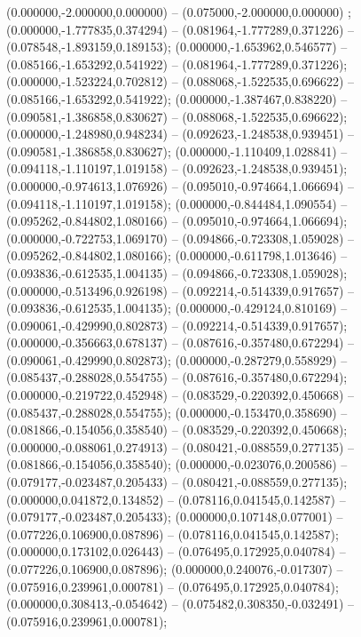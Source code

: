  (0.000000,-2.000000,0.000000) -- (0.075000,-2.000000,0.000000) ;
 (0.000000,-1.777835,0.374294) -- (0.081964,-1.777289,0.371226) -- (0.078548,-1.893159,0.189153);
 (0.000000,-1.653962,0.546577) -- (0.085166,-1.653292,0.541922) -- (0.081964,-1.777289,0.371226);
 (0.000000,-1.523224,0.702812) -- (0.088068,-1.522535,0.696622) -- (0.085166,-1.653292,0.541922);
 (0.000000,-1.387467,0.838220) -- (0.090581,-1.386858,0.830627) -- (0.088068,-1.522535,0.696622);
 (0.000000,-1.248980,0.948234) -- (0.092623,-1.248538,0.939451) -- (0.090581,-1.386858,0.830627);
 (0.000000,-1.110409,1.028841) -- (0.094118,-1.110197,1.019158) -- (0.092623,-1.248538,0.939451);
 (0.000000,-0.974613,1.076926) -- (0.095010,-0.974664,1.066694) -- (0.094118,-1.110197,1.019158);
 (0.000000,-0.844484,1.090554) -- (0.095262,-0.844802,1.080166) -- (0.095010,-0.974664,1.066694);
 (0.000000,-0.722753,1.069170) -- (0.094866,-0.723308,1.059028) -- (0.095262,-0.844802,1.080166);
 (0.000000,-0.611798,1.013646) -- (0.093836,-0.612535,1.004135) -- (0.094866,-0.723308,1.059028);
 (0.000000,-0.513496,0.926198) -- (0.092214,-0.514339,0.917657) -- (0.093836,-0.612535,1.004135);
 (0.000000,-0.429124,0.810169) -- (0.090061,-0.429990,0.802873) -- (0.092214,-0.514339,0.917657);
 (0.000000,-0.356663,0.678137) -- (0.087616,-0.357480,0.672294) -- (0.090061,-0.429990,0.802873);
 (0.000000,-0.287279,0.558929) -- (0.085437,-0.288028,0.554755) -- (0.087616,-0.357480,0.672294);
 (0.000000,-0.219722,0.452948) -- (0.083529,-0.220392,0.450668) -- (0.085437,-0.288028,0.554755);
 (0.000000,-0.153470,0.358690) -- (0.081866,-0.154056,0.358540) -- (0.083529,-0.220392,0.450668);
 (0.000000,-0.088061,0.274913) -- (0.080421,-0.088559,0.277135) -- (0.081866,-0.154056,0.358540);
 (0.000000,-0.023076,0.200586) -- (0.079177,-0.023487,0.205433) -- (0.080421,-0.088559,0.277135);
 (0.000000,0.041872,0.134852) -- (0.078116,0.041545,0.142587) -- (0.079177,-0.023487,0.205433);
 (0.000000,0.107148,0.077001) -- (0.077226,0.106900,0.087896) -- (0.078116,0.041545,0.142587);
 (0.000000,0.173102,0.026443) -- (0.076495,0.172925,0.040784) -- (0.077226,0.106900,0.087896);
 (0.000000,0.240076,-0.017307) -- (0.075916,0.239961,0.000781) -- (0.076495,0.172925,0.040784);
 (0.000000,0.308413,-0.054642) -- (0.075482,0.308350,-0.032491) -- (0.075916,0.239961,0.000781);
